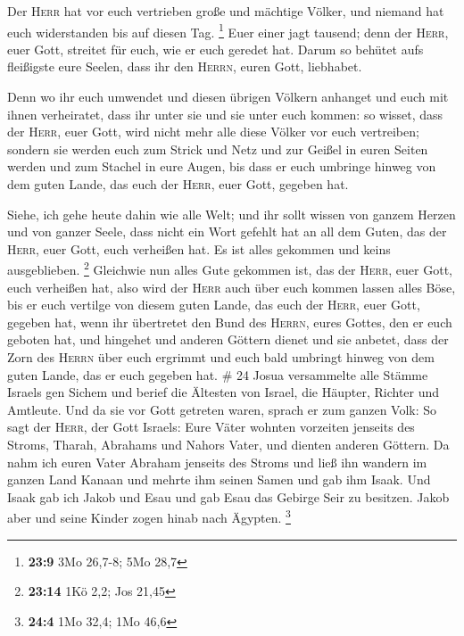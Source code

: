  Der \textsc{Herr} hat vor euch vertrieben große und
mächtige Völker, und niemand hat euch widerstanden bis auf diesen Tag.
\footnote{\textbf{23:9} 3Mo 26,7-8; 5Mo 28,7}  Euer einer
jagt tausend; denn der \textsc{Herr}, euer Gott, streitet für euch, wie
er euch geredet hat.  Darum so behütet aufs fleißigste
eure Seelen, dass ihr den \textsc{Herrn}, euren Gott, liebhabet.

 Denn wo ihr euch umwendet und diesen übrigen Völkern
anhanget und euch mit ihnen verheiratet, dass ihr unter sie und sie
unter euch kommen:  so wisset, dass der \textsc{Herr},
euer Gott, wird nicht mehr alle diese Völker vor euch vertreiben;
sondern sie werden euch zum Strick und Netz und zur Geißel in euren
Seiten werden und zum Stachel in eure Augen, bis dass er euch umbringe
hinweg von dem guten Lande, das euch der \textsc{Herr}, euer Gott,
gegeben hat.

 Siehe, ich gehe heute dahin wie alle Welt; und ihr sollt
wissen von ganzem Herzen und von ganzer Seele, dass nicht ein Wort
gefehlt hat an all dem Guten, das der \textsc{Herr}, euer Gott, euch
verheißen hat. Es ist alles gekommen und keins ausgeblieben. \footnote{\textbf{23:14}
  1Kö 2,2; Jos 21,45}  Gleichwie nun alles Gute gekommen
ist, das der \textsc{Herr}, euer Gott, euch verheißen hat, also wird der
\textsc{Herr} auch über euch kommen lassen alles Böse, bis er euch
vertilge von diesem guten Lande, das euch der \textsc{Herr}, euer Gott,
gegeben hat,  wenn ihr übertretet den Bund des
\textsc{Herrn}, eures Gottes, den er euch geboten hat, und hingehet und
anderen Göttern dienet und sie anbetet, dass der Zorn des \textsc{Herrn}
über euch ergrimmt und euch bald umbringt hinweg von dem guten Lande,
das er euch gegeben hat. \# 24  Josua versammelte alle
Stämme Israels gen Sichem und berief die Ältesten von Israel, die
Häupter, Richter und Amtleute. Und da sie vor Gott getreten waren,
 sprach er zum ganzen Volk: So sagt der \textsc{Herr}, der
Gott Israels: Eure Väter wohnten vorzeiten jenseits des Stroms, Tharah,
Abrahams und Nahors Vater, und dienten anderen Göttern. 
Da nahm ich euren Vater Abraham jenseits des Stroms und ließ ihn wandern
im ganzen Land Kanaan und mehrte ihm seinen Samen und gab ihm Isaak.
 Und Isaak gab ich Jakob und Esau und gab Esau das Gebirge
Seir zu besitzen. Jakob aber und seine Kinder zogen hinab nach Ägypten.
\footnote{\textbf{24:4} 1Mo 32,4; 1Mo 46,6}

